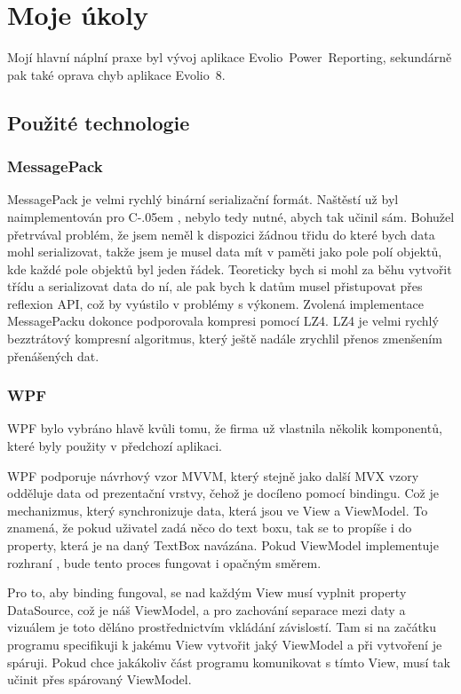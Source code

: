 \documentclass[czech,bachelor,dept460,male,csharp]{diploma}
\newcommand{\EvolioEight}{Evolio~8}
\newcommand{\EFilters}{Evolio~Power~Reporting}
\newcommand{\Csharp}{%
  {\settoheight{\dimen0}{C}C\kern-.05em \resizebox{!}{\dimen0}{\raisebox{\depth}{\#}}}}
\begin{document}
\section{Moje úkoly}
	Mojí hlavní náplní praxe byl vývoj aplikace {\EFilters}, sekundárně pak také oprava chyb aplikace {\EvolioEight}.
	\subsection{Použité technologie}
			\subsubsection{MessagePack}
			MessagePack\cite{mpSpec} je velmi rychlý binární serializační formát. Naštěstí už byl naimplementován pro {\Csharp}, nebylo tedy nutné, abych tak učinil sám. Bohužel přetrvával problém, že jsem neměl k dispozici žádnou třidu do které bych data mohl serializovat, takže jsem je musel data mít v paměti jako pole polí objektů, kde každé pole objektů byl jeden řádek. Teoreticky bych si mohl za běhu vytvořit třídu a serializovat data do ní, ale pak bych k datům musel přistupovat přes reflexion API, což by vyústilo v problémy s výkonem. Zvolená implementace MessagePacku\cite{mpImpl} dokonce podporovala kompresi pomocí LZ4. LZ4\cite{l4z} je velmi rychlý bezztrátový kompresní algoritmus, který ještě nadále zrychlil přenos zmenšením přenášených dat. 
		\subsubsection{WPF}
			WPF bylo vybráno hlavě kvůli tomu, že firma už vlastnila několik komponentů, které byly použity v předchozí aplikaci.
			
			WPF podporuje návrhový vzor MVVM, který stejně jako další MVX vzory odděluje data od prezentační vrstvy, čehož je docíleno pomocí bindingu. Což je mechanizmus, který synchronizuje data, která jsou ve View a ViewModel. To znamená, že pokud uživatel zadá něco do text boxu, tak se to propíše i do property, která je na daný TextBox navázána. Pokud ViewModel implementuje rozhraní , bude tento proces fungovat i opačným směrem.
			
			Pro to, aby binding fungoval, se nad každým View musí vyplnit property DataSource, což je náš ViewModel, a pro zachování separace mezi daty a vizuálem je toto děláno prostřednictvím vkládání závislostí. Tam si na začátku programu specifikuji k jakému View vytvořit jaký ViewModel a při vytvoření je spáruji. Pokud chce jakákoliv část programu komunikovat s tímto View, musí tak učinit přes spárovaný ViewModel.
			
\end{document}
